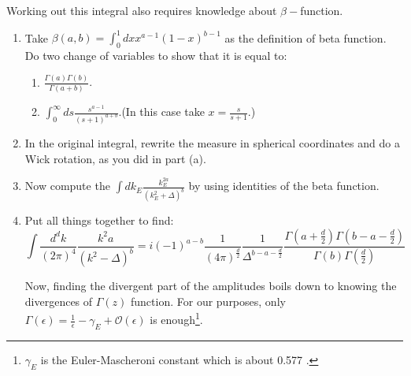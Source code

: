 \documentclass[11pt]{article}
\begin{document}
\begin{enumerate}
\begin{problem}{\points{-}}
		Working out this integral also requires knowledge about $\beta-$function.
		\begin{enumerate}
			\item Take $\beta(a,b) = \int_0^1 dx x^{a-1} (1-x)^{b-1}$ as the definition of beta function. Do two change of variables to show that it is equal to:
			\begin{enumerate}
				\item $\frac{\Gamma(a)\Gamma(b)}{\Gamma(a+b)}$.
				\item $\int_0^\infty ds \frac{s^{a-1}}{(s+1)^{a+b}}$.(In this case take $x= \frac{s}{s+1}$.)
			\end{enumerate}
		\item In the original integral, rewrite the measure in spherical coordinates and do a Wick rotation, as you did in part (a).
		\item  Now compute the $\int dk_E \frac{k_E^{2a}}{(k^2_E +\Delta)^b}$ by using identities of the beta function.
		\item Put all things together to find:
		\begin{equation}
			\int \frac{d^dk}{(2\pi)^4} \frac{k^2a}{(k^2 - \Delta)^b} = i (-1)^{a-b} \frac{1}{(4\pi)^{\frac{d}{2}}} \frac{1}{\Delta^{b-a-\frac{d}{2}}}\frac{
			\Gamma(a+\frac{d}{2})	\Gamma(b-a-\frac{d}{2})
		}{\Gamma(b) \Gamma(\frac{d}{2})}
		\label{mainint}
		\end{equation}
	
		Now, finding the divergent part of the amplitudes boils down to knowing the divergences of $\Gamma(z)$ function. For our purposes, only $\Gamma(\epsilon) = \frac{1}{\epsilon} -\gamma_E + \mathcal{O}(\epsilon)$ is enough\footnote{$\gamma_E$ is the Euler-Mascheroni constant which is about 0.577 .}.
		

\end{enumerate}
\end{problem}
\end{enumerate}
\end{document}
